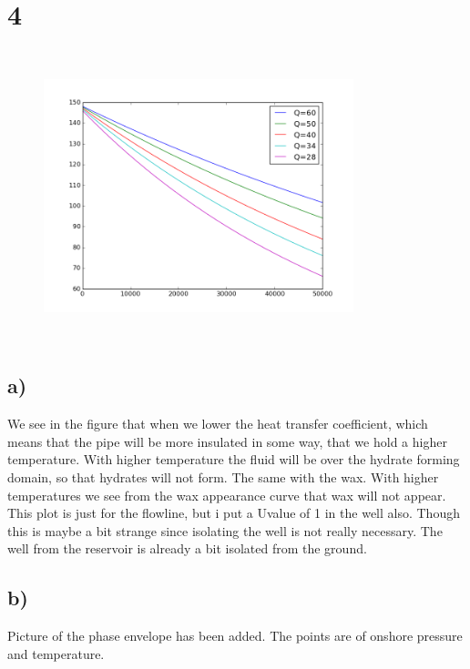 \documentclass[DIV=calc, paper=a4, fontsize=13pt, twocolumn]{scrartcl}	 %
\begin{document}
\section*{4}
\begin{figure}[h]
\includegraphics[width=9cm,height=8.5cm]{Temp_insulated.png}
\end{figure}
\subsection*{a)}
We see in the figure that when we lower the heat transfer coefficient, which means that the pipe will be more insulated in some way, that we hold a higher temperature. With higher temperature the fluid will be over the hydrate forming domain, so that hydrates will not form. The same with the wax. With higher temperatures we see from the wax appearance curve that wax will not appear.
\newline
This plot is just for the flowline, but i put a Uvalue of 1 in the well also. Though this is maybe a bit strange since isolating the well is not really necessary. The well from the reservoir is already a bit isolated from the ground.
\subsection*{b)}
Picture of the phase envelope has been added. The points are of onshore pressure and temperature.
\end{document}
